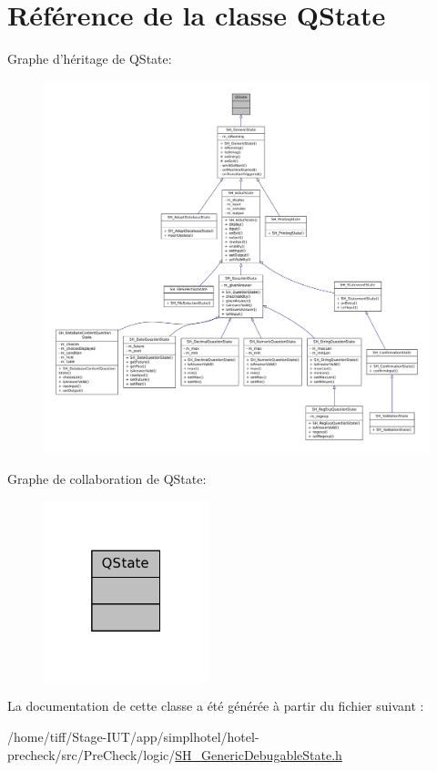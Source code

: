 \hypertarget{classQState}{\section{Référence de la classe Q\-State}
\label{classQState}
}


Graphe d'héritage de Q\-State\-:
\nopagebreak
\begin{figure}[H]
\begin{center}
\leavevmode
\includegraphics[width=350pt]{classQState__inherit__graph}
\end{center}
\end{figure}


Graphe de collaboration de Q\-State\-:\nopagebreak
\begin{figure}[H]
\begin{center}
\leavevmode
\includegraphics[width=136pt]{classQState__coll__graph}
\end{center}
\end{figure}


La documentation de cette classe a été générée à partir du fichier suivant \-:\begin{DoxyCompactItemize}
\item 
/home/tiff/\-Stage-\/\-I\-U\-T/app/simplhotel/hotel-\/precheck/src/\-Pre\-Check/logic/\hyperlink{SH__GenericDebugableState_8h}{S\-H\-\_\-\-Generic\-Debugable\-State.\-h}\end{DoxyCompactItemize}
